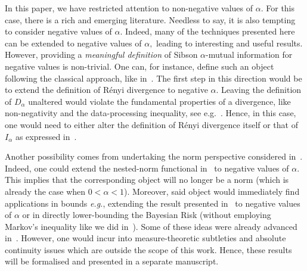 \documentclass{article}
\numberwithin{theorem}{section}
\numberwithin{example}{section}
\numberwithin{remark}{section}
\numberwithin{definition}{section}
\begin{document}
In this paper, we have restricted attention to non-negative values of $\alpha.$ For this case, there is a rich and emerging literature. Needless to say, it is also tempting to consider negative values of $\alpha.$ Indeed, many of the techniques presented here can be extended to negative values of $\alpha,$ leading to interesting and useful results. However, providing a {\it meaningful definition} of Sibson $\alpha$-mutual information for negative values is non-trivial. 
 One can, for instance, define such an object following the classical approach, like in~. The first step in this direction would be to extend the definition of R\'enyi divergence to negative $\alpha.$ Leaving the definition of $D_\alpha$ unaltered would violate the fundamental properties of a divergence, like non-negativity and the data-processing inequality, see e.g.~\cite[Section V]{renyiDiv}.
 Hence, in this case, one would need to either alter the definition of R\'enyi divergence itself or that of $I_\alpha$ as expressed in~.  
 
Another possibility comes from undertaking the norm perspective considered in~. Indeed, one could extend the nested-norm functional in~ to negative values of $\alpha$. This implies that the corresponding object will no longer be a norm (which is already the case when $0<\alpha<1$). 
Moreover, said object would immediately find applications in bounds \textit{e.g.}, 
 extending the result presented in~ to negative values of $\alpha$ or in directly lower-bounding the Bayesian Risk (without employing Markov's inequality like we did in~). Some of these ideas were already advanced in~\cite{EspositoVG:23,EspositoVG:22}. However, one would incur into measure-theoretic subtleties and absolute continuity issues which are outside the scope of this work. Hence, these results will be formalised and presented in a separate manuscript.
\end{document}
